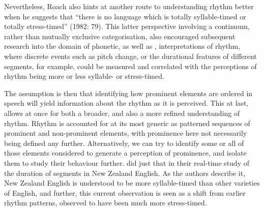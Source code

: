 \documentclass[output=paper]{langsci/langscibook}
\begin{document}
Nevertheless, Roach also hints at another route to understanding rhythm better when he suggests that “there is no language which is totally syllable-timed or totally stress-timed” (1982: 79). This latter perspective involving a continuum, rather than mutually exclusive categorisation, also encouraged subsequent research into the domain of phonetic, as well as , interpretations of rhythm, where discrete events such as pitch change, or the durational features of different segments, for example, could be measured and correlated with the perceptions of rhythm being more or less syllable- or stress-timed.

The assumption is then that identifying how prominent elements are ordered in speech \citep{Nesporetal2011} will yield information about the rhythm as it is perceived. This at last, allows at once for both a broader, and also a more refined understanding of rhythm. Rhythm is accounted for at its most generic as patterned sequences of prominent and non-prominent elements, with prominence here not necessarily being defined any further. Alternatively, we can try to identify some or all of those elements considered to generate a perception of prominence, and isolate them to study their behaviour further. \citet{NokesHay2012} did just that in their real-time study of the duration of segments in New Zealand English. As the authors describe it, New Zealand English is understood to be more syllable-timed than other varieties of English, and further, this current observation is seen as a shift from earlier rhythm patterns, observed to have been much more stress-timed. 
\end{document}
